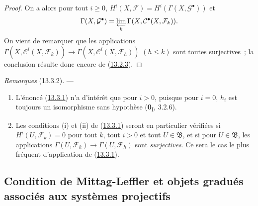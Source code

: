 \begin{proof}
On a alors pour tout $i\geq0$,
$H^i(X,\mathcal F)=H^i(\Gamma(X,\mathcal G^\bullet))$ et
\[
\Gamma(X,\mathcal G^\bullet)
=\varprojlim_k\Gamma(X,\mathcal C^\bullet(X,\mathcal F_k)).
\]
On vient de remarquer que les applications
$\Gamma(X,\mathcal C^i(X,\mathcal F_k))\to
\Gamma(X,\mathcal C^i(X,\mathcal F_h))$ $(h\leq k)$ sont toutes
surjectives~; la conclusion résulte donc encore de
(\hyperref[0.13.2.3-fr]{13.2.3}).
\end{proof}

\begin{env}[13.3.2]
\label{0.13.3.2-fr}
\emph{Remarques} (13.3.2). ---
\begin{enumerate}
\item[(i)]
L'énoncé (\hyperref[0.13.3.1-fr]{13.3.1}) n'a d'intérêt que pour $i>0$,
puisque pour $i=0$, $h_i$ est toujours un isomorphisme sans hypothèse
(\textbf{0}\textsubscript{I}, 3.2.6).
\item[(ii)]
Les conditions (i) et (ii) de (\hyperref[0.13.3.1-fr]{13.3.1}) seront en
particulier vérifiées si $H^i(U,\mathcal F_k)=0$ pour tout $k$, tout $i>0$
et tout $U\in\mathfrak B$, et si pour $U\in\mathfrak B$, les applications
$\Gamma(U,\mathcal F_k)\to\Gamma(U,\mathcal F_h)$ sont \emph{surjectives}. Ce sera
le cas le plus fréquent d'application de
(\hyperref[0.13.3.1-fr]{13.3.1}).
\end{enumerate}
\end{env}

\subsection{Condition de Mittag-Leffler et objets gradués associés aux systèmes projectifs}
\label{subsection:0.13.4-fr}
\label{0.13.4-fr}

